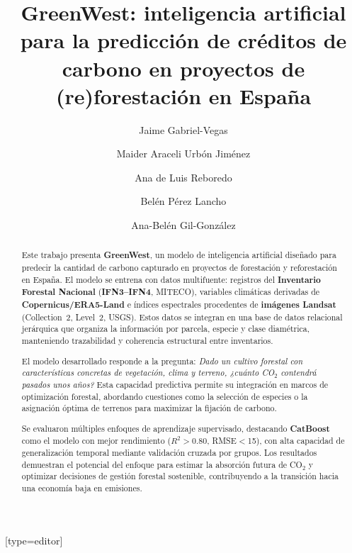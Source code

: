 \documentclass[a4paper,fleqn]{cas-dc}
\numberwithin{equation}{section}
\numberwithin{figure}{section}
\numberwithin{table}{section}
\begin{document}

\title [mode = title]{GreenWest: inteligencia artificial para la predicción de créditos de carbono en proyectos de (re)forestación en España}

\author[1]{Jaime Gabriel-Vegas}[type=editor]
\cormark[1]

\author[1]{Maider Araceli Urbón Jiménez}

\author[1]{Ana de Luis Reboredo}

\author[1]{Belén Pérez Lancho}

\author[1]{Ana-Belén Gil-González}



\begin{abstract}
Este trabajo presenta \textbf{GreenWest}, un modelo de inteligencia artificial diseñado para predecir la cantidad de carbono capturado en proyectos de forestación y reforestación en España. El modelo se entrena con datos multifuente: registros del \textbf{Inventario Forestal Nacional} (\textbf{IFN3--IFN4}, MITECO), variables climáticas derivadas de \textbf{Copernicus/ERA5-Land} e índices espectrales procedentes de \textbf{imágenes Landsat} (Collection~2, Level~2, USGS). Estos datos se integran en una base de datos relacional jerárquica que organiza la información por parcela, especie y clase diamétrica, manteniendo trazabilidad y coherencia estructural entre inventarios.

El modelo desarrollado responde a la pregunta: \textit{Dado un cultivo forestal con características concretas de vegetación, clima y terreno, ¿cuánto CO$_2$ contendrá pasados unos años?} Esta capacidad predictiva permite su integración en marcos de optimización forestal, abordando cuestiones como la selección de especies o la asignación óptima de terrenos para maximizar la fijación de carbono.

Se evaluaron múltiples enfoques de aprendizaje supervisado, destacando \textbf{CatBoost} como el modelo con mejor rendimiento ($R^2>0.80$, RMSE$<$15), con alta capacidad de generalización temporal mediante validación cruzada por grupos. Los resultados demuestran el potencial del enfoque para estimar la absorción futura de CO$_2$ y optimizar decisiones de gestión forestal sostenible, contribuyendo a la transición hacia una economía baja en emisiones.
\end{abstract}
\end{document}
